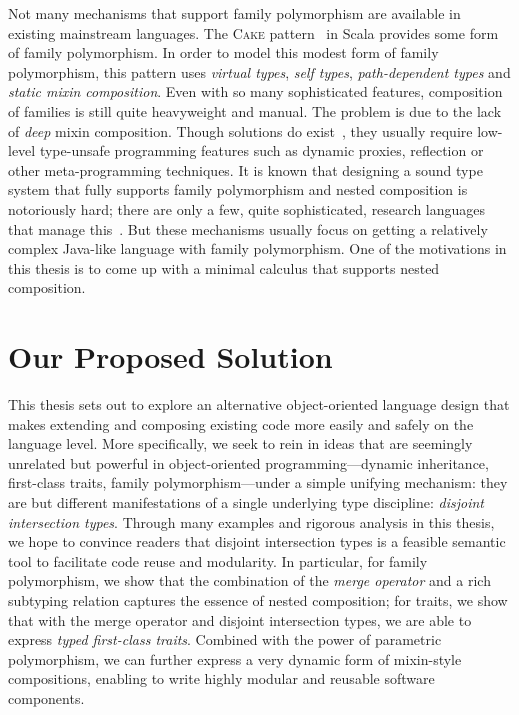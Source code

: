 Not many mechanisms that support family polymorphism are available in existing
mainstream languages. The \textsc{Cake} pattern~\citep{odersky2005scalable,
  Zenger-Odersky2005} in Scala provides some form of family polymorphism. In
order to model this modest form of family polymorphism, this pattern uses
\textit{virtual types}, \textit{self types}, \textit{path-dependent types} and
\textit{static mixin composition}. Even with so many sophisticated features,
composition of families is still quite heavyweight and manual. The problem is
due to the lack of \textit{deep} mixin composition. Though solutions do
exist~\citep{oliveira2013feature}, they usually require low-level type-unsafe
programming features such as dynamic proxies, reflection or other
meta-programming techniques. It is known that designing a sound type system that
fully supports family polymorphism and nested composition is notoriously hard;
there are only a few, quite sophisticated, research languages that manage
this~\citep{ErnstVirtual, Nystrom_2004,
  pubsdoc:tribe-virtual-calculus,SAITO_2007}. But these mechanisms usually focus
on getting a relatively complex Java-like language with family polymorphism. One
of the motivations in this thesis is to come up with a minimal calculus that
supports nested composition.



\section{Our Proposed Solution}

This thesis sets out to explore an alternative object-oriented language design
that makes extending and composing existing code more easily and safely on the
language level. More specifically, we seek to rein in ideas that are seemingly
unrelated but powerful in object-oriented programming---dynamic inheritance,
first-class traits, family polymorphism---under a simple unifying mechanism:
they are but different manifestations of a single underlying type discipline:
\textit{disjoint intersection types}. Through many examples and rigorous
analysis in this thesis, we hope to convince readers that disjoint intersection
types is a feasible semantic tool to facilitate code reuse and modularity. In
particular, for family polymorphism, we show that the combination of the
\textit{merge operator} and a rich subtyping relation captures the essence of
nested composition; for traits, we show that with the merge operator and
disjoint intersection types, we are able to express \textit{typed first-class
  traits}. Combined with the power of parametric polymorphism, we can further
express a very dynamic form of mixin-style compositions, enabling to write highly
modular and reusable software components.

